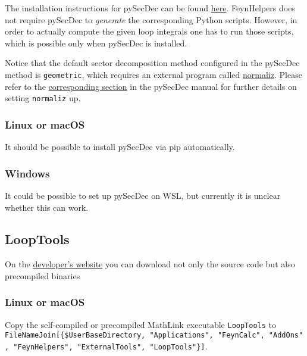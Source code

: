 \documentclass[../FeynHelpersManual.tex]{subfiles}
\begin{document}
The installation instructions for pySecDec can be found
\href{https://secdec.readthedocs.io/en/stable/installation.html\#download-the-program-and-install}{here}.
FeynHelpers does not require pySecDec to \emph{generate} the
corresponding Python scripts. However, in order to actually compute the
given loop integrals one has to run those scripts, which is possible
only when pySecDec is installed.

Notice that the default sector decomposition method configured in the
pySecDec method is \texttt{geometric}, which requires an external
program called \href{https://www.normaliz.uni-osnabrueck.de}{normaliz}.
Please refer to the
\href{https://secdec.readthedocs.io/en/stable/installation.html?highlight=normaliz\#the-geomethod-and-normaliz}{corresponding
section} in the pySecDec manual for further details on setting
\texttt{normaliz} up.

\hypertarget{linux-or-macos}{%
\subsubsection{Linux or macOS}\label{linux-or-macos}}

It should be possible to install pySecDec via pip automatically.

\hypertarget{windows-3}{%
\subsubsection{Windows}\label{windows-3}}

It could be possible to set up pySecDec on WSL, but currently it is
unclear whether this can work.

\hypertarget{looptools}{%
\subsection{LoopTools}\label{looptools}}

On the \href{http://www.feynarts.de/looptools/}{developer's website} you
can download not only the source code but also precompiled binaries

\hypertarget{linux-or-macos-1}{%
\subsubsection{Linux or macOS}\label{linux-or-macos-1}}

Copy the self-compiled or precompiled MathLink executable
\texttt{LoopTools} to
\texttt{FileNameJoin[\allowbreak{}\{\allowbreak{}\$UserBaseDirectory,\ \allowbreak{}"Applications",\ \allowbreak{}"FeynCalc",\ \allowbreak{}"AddOns",\ \allowbreak{}"FeynHelpers",\ \allowbreak{}"ExternalTools",\ \allowbreak{}"LoopTools"\}]}.
\end{document}
